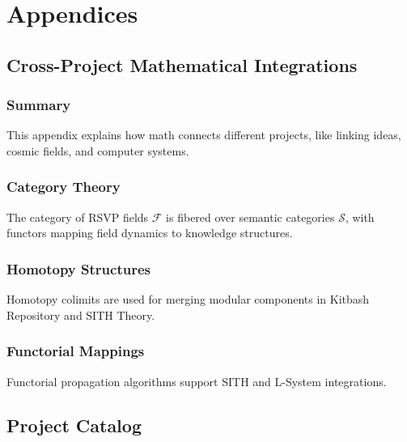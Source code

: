 \documentclass[11pt,oneside]{memoir}
\theoremstyle{plain}
\newcommand{\F}{\mathcal{F}}
\newcommand{\Sfun}{\mathcal{S}}
\begin{document}
\part{Appendices}
\appendix
\chapter{Cross-Project Mathematical Integrations}
\label{app:category_theory}
\section{Summary}
This appendix explains how math connects different projects, like linking ideas, cosmic fields, and computer systems.

\section{Category Theory}
The category of RSVP fields \(\F\) is fibered over semantic categories \(\Sfun\), with functors mapping field dynamics to knowledge structures.

\section{Homotopy Structures}
\label{app:homotopy_structures}
Homotopy colimits are used for merging modular components in Kitbash Repository and SITH Theory.

\section{Functorial Mappings}
\label{app:functorial_mappings}
Functorial propagation algorithms support SITH and L-System integrations.

\chapter{Project Catalog}
\label{app:project_catalog}
\end{document}
